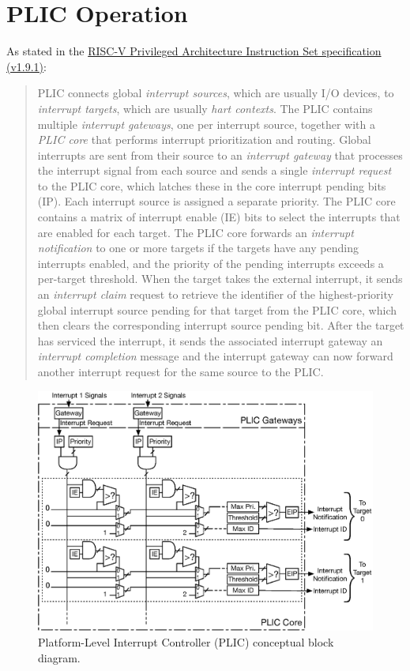 \section{PLIC Operation}

As stated in the \href{https://github.com/riscv/riscv-isa-manual/blob/master/release/riscv-privileged-v1.9.1.pdf}{RISC-V Privileged Architecture Instruction Set specification (v1.9.1)}:

\begin{quote}

PLIC connects global \emph{interrupt sources}, which are usually
I/O devices, to \emph{interrupt targets}, which are usually \emph{hart
  contexts}.  The PLIC contains multiple \emph{interrupt gateways}, one
per interrupt source, together with a \emph{PLIC core} that performs
interrupt prioritization and routing.  Global interrupts are sent from
their source to an \emph{interrupt gateway} that processes the
interrupt signal from each source and sends a single \emph{interrupt
  request} to the PLIC core, which latches these in the core interrupt
pending bits (IP).  Each interrupt source is assigned a separate
priority.  The PLIC core contains a matrix of interrupt enable (IE)
bits to select the interrupts that are enabled for each target.  The
PLIC core forwards an \emph{interrupt notification} to one or more
targets if the targets have any pending interrupts enabled, and the
priority of the pending interrupts exceeds a per-target threshold.
When the target takes the external interrupt, it sends an \emph{
  interrupt claim} request to retrieve the identifier of the
highest-priority global interrupt source pending for that target from
the PLIC core, which then clears the corresponding interrupt source
pending bit.  After the target has serviced the interrupt, it sends
the associated interrupt gateway an \emph{interrupt completion} message
and the interrupt gateway can now forward another interrupt request
for the same source to the PLIC.

\end{quote}

\begin{figure}[htb]
\centering
\includegraphics[width=\textwidth]{assets/img/PLIC-block-diagram}
\caption{Platform-Level Interrupt Controller (PLIC) conceptual block diagram.}
\label{fig:plic-block-diagram}
\end{figure}

